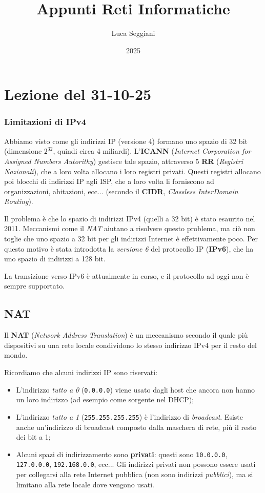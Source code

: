 \documentclass[a4paper,11pt]{article}
\title{Appunti Reti Informatiche}
\author{Luca Seggiani}
\date{2025}
\begin{document}
\section{Lezione del 31-10-25}

\thispagestyle{empty}
\pagestyle{fancy}

\subsubsection{Limitazioni di IPv4}
Abbiamo visto come gli indirizzi IP (versione 4) formano uno spazio di 32 bit (dimensione $2^32$, quindi circa 4 miliardi).
L'\textbf{ICANN} (\textit{Internet Corporation for Assigned Numbers Autorithy}) gestisce tale spazio, attraverso 5 \textbf{RR} (\textit{Registri Nazionali}), che a loro volta allocano i loro registri privati.
Questi registri allocano poi blocchi di indirizzi IP agli ISP, che a loro volta li forniscono ad organizzazioni, abitazioni, ecc... (secondo il \textbf{CIDR}, \textit{Classless InterDomain Routing}).

Il problema è che lo spazio di indirizzi IPv4 (quelli a 32 bit) è stato esaurito nel 2011.
Meccanismi come il \textit{NAT} aiutano a risolvere questo problema, ma ciò non toglie che uno spazio a 32 bit per gli indirizzi Internet è effettivamente poco.
Per questo motivo è stata introdotta la \textit{versione 6} del protocollo IP (\textbf{IPv6}), che ha uno spazio di indirizzi a 128 bit.

La transizione verso IPv6 è attualmente in corso, e il protocollo ad oggi non è sempre supportato.

\subsection{NAT}
Il \textbf{NAT} (\textit{Network Address Translation}) è un meccanismo secondo il quale più dispositivi su una rete locale condividono lo stesso indirizzo IPv4 per il resto del mondo.

Ricordiamo che alcuni indirizzi IP sono riservati:
\begin{itemize}
	\item L'indirizzo \textit{tutto a 0} (\lstinline|0.0.0.0|) viene usato dagli host che ancora non hanno un loro indirizzo (ad esempio come sorgente nel DHCP);
	\item L'indirizzo \textit{tutto a 1} (\lstinline|255.255.255.255|) è l'indirizzo di \textit{broadcast}. Esiste anche un'indirizzo di broadcast composto dalla maschera di rete, più il resto dei bit a 1;
	\item Alcuni spazi di indirizzamento sono \textbf{privati}: questi sono \lstinline|10.0.0.0|, \lstinline|127.0.0.0|, \lstinline|192.168.0.0|, ecc...
		Gli indirizzi privati non possono essere usati per collegarsi alla rete Internet pubblica (non sono indirizzi \textit{pubblici}), ma si limitano alla rete locale dove vengono usati.
\end{itemize}
\end{document}
